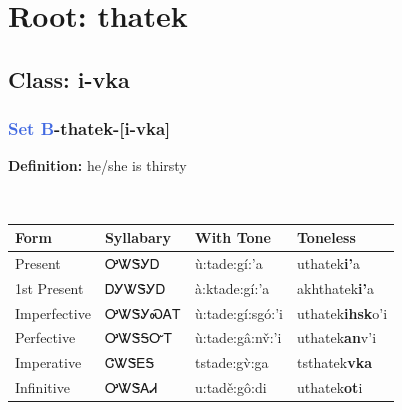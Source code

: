 \needspace{4in}
\section*{Root: thatek}
\nopagebreak
{}
\needspace{3in}
\subsection*{Class: i-vka}
\nopagebreak
\needspace{2in}
\subsubsection*{\textcolor{RoyalBlue}{Set B}{-}\textbf{thatek}{-}[i-vka]}
\nopagebreak
\textbf{Definition: } he/she is thirsty
\\[0.5em]
\begin{tabularx}{\textwidth}{l X X X}%
\toprule%
\textbf{Form}&\textbf{Syllabary}&\textbf{With Tone}&\textbf{Toneless}\\%
\midrule%
Present&ᎤᏔᏕᎩᎠ&ù:tade:gí:’a&uthatek\textbf{i'}a\\%
1st Present&ᎠᎩᏔᏕᎩᎠ&à:ktade:gí:’a&akhthatek\textbf{i'}a\\%
Imperfective&ᎤᏔᏕᎩᏍᎪᎢ&ù:tade:gí:sgó:’i&uthatek\textbf{ihsk}o'i\\%
Perfective&ᎤᏔᏕᎦᏅᎢ&ù:tade:gâ:nv̌:’i&uthatek\textbf{an}v'i\\%
Imperative&ᏣᏔᏕᎬᎦ&tstade:gv̀:ga&tsthatek\textbf{vka}\\%
Infinitive&ᎤᏔᏕᎪᏗ&u:tadě:gô:di&uthatek\textbf{ot}i\\%
\bottomrule%
\end{tabularx}
\\[1em]